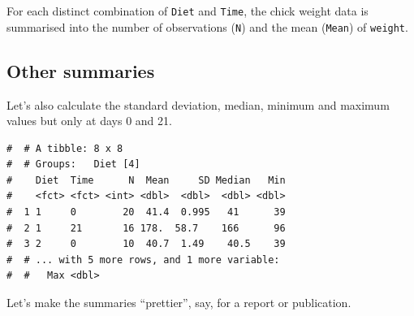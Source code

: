 \documentclass[a4paper,9pt,twocolumn,twoside,printwatermark=false]{pinp}
\begin{document}
For each distinct combination of \texttt{Diet} and \texttt{Time}, the
chick weight data is summarised into the number of observations
(\texttt{N}) and the mean (\texttt{Mean}) of \texttt{weight}.

\subsection{Other summaries}\label{other-summaries}

Let's also calculate the standard deviation, median, minimum and maximum
values but only at days 0 and 21.

\begin{Shaded}
\end{Shaded}

\begin{ShadedResult}
\begin{verbatim}
#  # A tibble: 8 x 8
#  # Groups:   Diet [4]
#    Diet  Time      N  Mean     SD Median   Min
#    <fct> <fct> <int> <dbl>  <dbl>  <dbl> <dbl>
#  1 1     0        20  41.4  0.995   41      39
#  2 1     21       16 178.  58.7    166      96
#  3 2     0        10  40.7  1.49    40.5    39
#  # ... with 5 more rows, and 1 more variable:
#  #   Max <dbl>
\end{verbatim}
\end{ShadedResult}

Let's make the summaries ``prettier'', say, for a report or publication.
\end{document}
